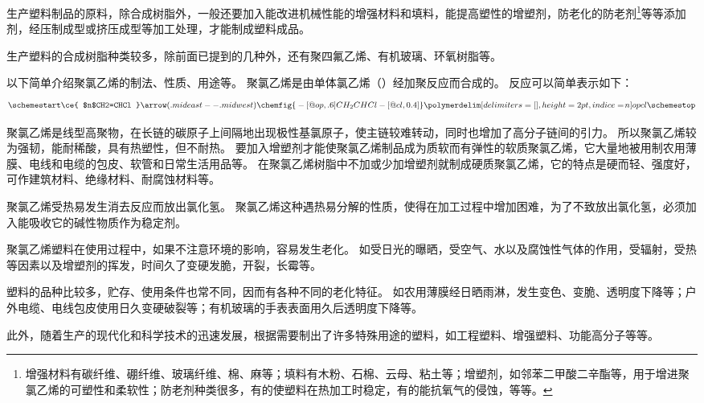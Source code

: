 生产塑料制品的原料，除合成树脂外，一般还要加入能改进机械性能的增强材料和填料，能提高塑性的增塑剂，防老化的防老剂\footnote{增强材料有碳纤维、硼纤维、玻璃纤维、棉、麻等；填料有木粉、石棉、云母、粘土等；增塑剂，如邻苯二甲酸二辛酯等，用于增进聚氯乙烯的可塑性和柔软性；防老剂种类很多，有的使塑料在热加工时稳定，有的能抗氧气的侵蚀，等等。}等等添加剂，经压制成型或挤压成型等加工处理，才能制成塑料成品。

生产塑料的合成树脂种类较多，除前面已提到的几种外，还有聚四氟乙烯、有机玻璃、环氧树脂等。

以下简单介绍聚氯乙烯的制法、性质、用途等。
聚氯乙烯是由单体氯乙烯（）经加聚反应而合成的。
反应可以简单表示如下：
\[\schemestart 
\ce{ $n$CH2=CHCl }  
\arrow(.mid east--.mid west)
\chemfig{\vphantom{CH_2}-[@{op,.6}]CH_2CHCl-[@{cl,0.4}]}
\polymerdelim[delimiters ={[]},height=2pt,indice =\!n]{op}{cl}
\schemestop\]

聚氯乙烯是线型高聚物，在长链的碳原子上间隔地出现极性基氯原子，使主链较难转动，同时也增加了高分子链间的引力。
所以聚氯乙烯较为强韧，能耐稀酸，具有热塑性，但不耐热。
要加入增塑剂才能使聚氯乙烯制品成为质软而有弹性的软质聚氯乙烯，它大量地被用制农用薄膜、电线和电缆的包皮、软管和日常生活用品等。
在聚氯乙烯树脂中不加或少加增塑剂就制成硬质聚氯乙烯，它的特点是硬而轻、强度好，可作建筑材料、绝缘材料、耐腐蚀材料等。

聚氯乙烯受热易发生消去反应而放出氯化氢。
聚氯乙烯这种遇热易分解的性质，使得在加工过程中增加困难，为了不致放出氯化氢，必须加入能吸收它的碱性物质作为稳定剂。

聚氯乙烯塑料在使用过程中，如果不注意环境的影响，容易发生老化。
如受日光的曝晒，受空气、水以及腐蚀性气体的作用，受辐射，受热等因素以及增塑剂的挥发，时间久了变硬发脆，开裂，长霉等。

塑料的品种比较多，贮存、使用条件也常不同，因而有各种不同的老化特征。
如农用薄膜经日晒雨淋，发生变色、变脆、透明度下降等；户外电缆、电线包皮使用日久变硬破裂等；有机玻璃的手表表面用久后透明度下降等。

此外，随着生产的现代化和科学技术的迅速发展，根据需要制出了许多特殊用途的塑料，如工程塑料、增强塑料、功能高分子等等。

